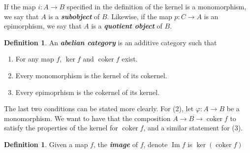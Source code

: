 \documentclass[psamsfonts]{amsart}
\theoremstyle{definition}
\newtheorem{defn}[thm]{Definition}
\theoremstyle{remark}
\newcommand{\ib}[1]{\textbf{\textit{#1}}}
\DeclareMathOperator{\im}{Im}
\DeclareMathOperator{\coker}{coker}
\begin{document}
If the map $i: A \to B$ specified in the definition of the kernel is a monomorphism, we say that $A$ is a \ib{subobject} of $B$. Likewise, if the map $p: C \to A$ is an epimorphism, we say that $A$ is a \ib{quotient object} of $B$.
%
\begin{defn}
An \ib{abelian category} is an additive category such that
\begin{enumerate}
\item For any map $f$, $\ker f$ and $\coker f$ exist.
\item Every monomorphism is the kernel of its cokernel.
\item Every epimoprhism is the cokernel of its kernel.
\end{enumerate}
The last two conditions can be stated more clearly. For (2), let $\varphi : A \to B$ be a monomorphism. We want to have that the composition $A \to B \to \coker f$ to satisfy the properties of the kernel for $\coker f$, and a similar statement for (3).
\end{defn}
%
\begin{defn}
Given a map $f$, the \ib{image} of $f$, denote $\im f$ is $\ker(\coker f)$
\end{defn}
\end{document}
